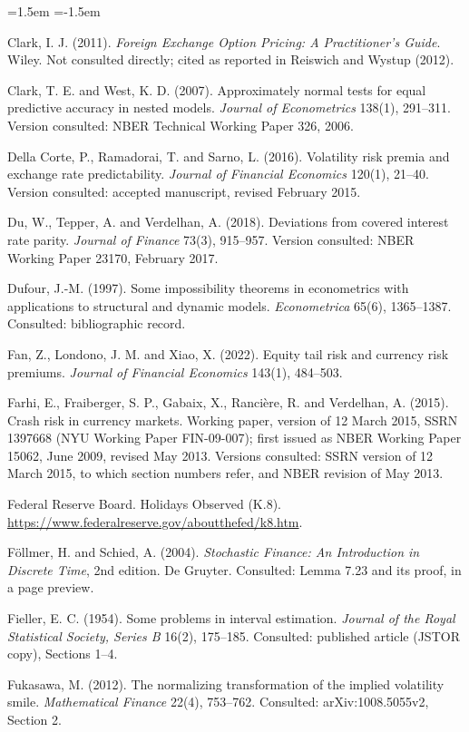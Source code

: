 \documentclass[11pt]{article}
\theoremstyle{result}
\begin{document}
\begin{list}{}{\leftmargin=1.5em \itemindent=-1.5em \itemsep=2pt \parsep=0pt}
\item Clark, I. J. (2011). \emph{Foreign Exchange Option Pricing: A Practitioner's Guide}. Wiley. Not consulted directly; cited as reported in Reiswich and Wystup (2012).
\item Clark, T. E. and West, K. D. (2007). Approximately normal tests for equal predictive accuracy in nested models. \emph{Journal of Econometrics} 138(1), 291--311. Version consulted: NBER Technical Working Paper 326, 2006.
\item Della Corte, P., Ramadorai, T. and Sarno, L. (2016). Volatility risk premia and exchange rate predictability. \emph{Journal of Financial Economics} 120(1), 21--40. Version consulted: accepted manuscript, revised February 2015.
\item Du, W., Tepper, A. and Verdelhan, A. (2018). Deviations from covered interest rate parity. \emph{Journal of Finance} 73(3), 915--957. Version consulted: NBER Working Paper 23170, February 2017.
\item Dufour, J.-M. (1997). Some impossibility theorems in econometrics with applications to structural and dynamic models. \emph{Econometrica} 65(6), 1365--1387. Consulted: bibliographic record.
\item Fan, Z., Londono, J. M. and Xiao, X. (2022). Equity tail risk and currency risk premiums. \emph{Journal of Financial Economics} 143(1), 484--503.
\item Farhi, E., Fraiberger, S. P., Gabaix, X., Ranci\`ere, R. and Verdelhan, A. (2015). Crash risk in currency markets. Working paper, version of 12 March 2015, SSRN 1397668 (NYU Working Paper FIN-09-007); first issued as NBER Working Paper 15062, June 2009, revised May 2013. Versions consulted: SSRN version of 12 March 2015, to which section numbers refer, and NBER revision of May 2013.
\item Federal Reserve Board. Holidays Observed (K.8). \url{https://www.federalreserve.gov/aboutthefed/k8.htm}.
\item F\"ollmer, H. and Schied, A. (2004). \emph{Stochastic Finance: An Introduction in Discrete Time}, 2nd edition. De Gruyter. Consulted: Lemma 7.23 and its proof, in a page preview.
\item Fieller, E. C. (1954). Some problems in interval estimation. \emph{Journal of the Royal Statistical Society, Series B} 16(2), 175--185. Consulted: published article (JSTOR copy), Sections 1--4.
\item Fukasawa, M. (2012). The normalizing transformation of the implied volatility smile. \emph{Mathematical Finance} 22(4), 753--762. Consulted: arXiv:1008.5055v2, Section 2.

\end{list}
\end{document}
